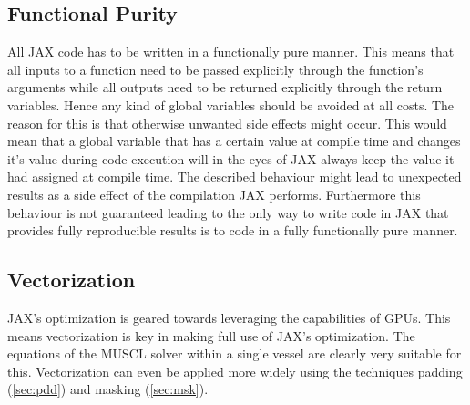 \documentclass[a4paper, oneside]{discothesis}
\begin{document}
							\subsection{Functional Purity}
							All JAX code has to be written in a functionally pure manner.
							This means that all inputs to a function need to be passed explicitly through the function's arguments while all outputs need to be returned explicitly through the return variables.
							Hence any kind of global variables should be avoided at all costs.
							The reason for this is that otherwise unwanted side effects might occur.
							This would mean that a global variable that has a certain value at compile time and changes it's value during code execution will in the eyes of JAX always keep the value it had assigned at compile time.
							The described behaviour might lead to unexpected results as a side effect of the compilation JAX performs.
							Furthermore this behaviour is not guaranteed leading to the only way to write code in JAX that provides fully reproducible results is to code in a fully functionally pure manner.

							\subsection{Vectorization} \label{sec:vect}
							JAX's optimization is geared towards leveraging the capabilities of GPUs.
							This means vectorization is key in making full use of JAX's optimization.
							The equations of the MUSCL solver within a single vessel are clearly very suitable for this.
							Vectorization can even be applied more widely using the techniques padding (\autoref{sec:pdd}) and masking (\autoref{sec:msk}).
\end{document}

